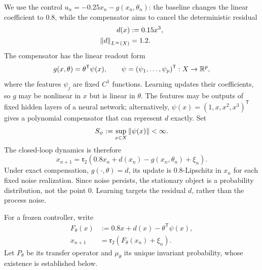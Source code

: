 We use the control $u_n=-0.25x_n-g(x_n,\theta_n)$: the baseline changes
the linear coefficient to $0.8$, while the compensator aims to cancel
the deterministic residual
\begin{align}
  d(x)&:=0.15x^3,
  \label{eq:duffing-residual}\\
  \left\lVert d\right\rVert_{L^\infty(X)}&=1.2.
  \label{eq:duffing-residual-bound}
\end{align}
The compensator has the linear readout form
\begin{equation}
  g(x,\theta)=\theta^{\mathsf T}\psi(x),
  \qquad \psi=(\psi_1,\ldots,\psi_p)^{\mathsf T}:X\to\mathbb{R}^p,
  \label{eq:duffing-neural-readout}
\end{equation}
where the features $\psi_j$ are fixed $C^1$ functions. Learning updates
their coefficients, so $g$ may be nonlinear in $x$ but is linear in
$\theta$. The features may be outputs of fixed hidden layers of a neural
network; alternatively, $\psi(x)=(1,x,x^2,x^3)^{\mathsf T}$ gives a
polynomial compensator that can represent $d$ exactly. Set
\begin{equation}
  S_\psi:=\sup_{x\in X}\left\lVert \psi(x)\right\rVert<\infty.
  \label{eq:duffing-Spsi}
\end{equation}
The closed-loop dynamics is therefore
\begin{equation}
  x_{n+1}=\mathfrak r_2\!\left(
    0.8x_n+d(x_n)-g(x_n,\theta_n)+\xi_n\right).
  \label{eq:duffing-adaptive-plant}
\end{equation}
Under exact compensation, $g(\cdot,\theta)=d$, its update is
$0.8$-Lipschitz in $x_n$ for each fixed noise realization. Since noise
persists, the stationary object is a probability distribution, not the
point $0$. Learning targets the residual $d$, rather than the process noise.

For a frozen controller, write
\begin{align}
  F_\theta(x)&:=0.8x+d(x)-\theta^{\mathsf T}\psi(x),
  \label{eq:duffing-Ftheta}\\
  x_{n+1}&=\mathfrak r_2\!\left(F_\theta(x_n)+\xi_n\right).
  \label{eq:reflected-duffing}
\end{align}
Let $P_\theta$ be its transfer operator and $\mu_\theta$ its unique
invariant probability, whose existence is established below.

